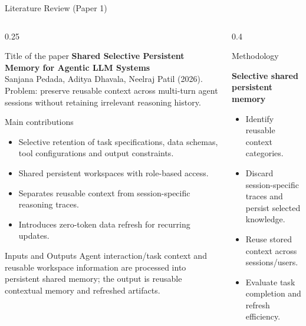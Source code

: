 \begin{frame}{Literature Review (Paper 1)}
\begin{columns}[T]
  \begin{column}{0.25\textwidth}
    \begin{block}{Title of the paper \cite{pedada26}}
      \tiny \textbf{Shared Selective Persistent Memory for Agentic LLM Systems}\\[2pt] Sanjana Pedada, Aditya Dhavala, Neelraj Patil (2026).\\[2pt] Problem: preserve reusable context across multi-turn agent sessions without retaining irrelevant reasoning history.
    \end{block}
    \vspace{0.12cm}
    \begin{block}{Main contributions}
      \tiny
      \begin{itemize}\setlength\itemsep{1pt}
      \item Selective retention of task specifications, data schemas, tool configurations and output constraints.
\item Shared persistent workspaces with role-based access.
\item Separates reusable context from session-specific reasoning traces.
\item Introduces zero-token data refresh for recurring updates.
      \end{itemize}
    \end{block}
    \vspace{0.12cm}
    \begin{block}{Inputs and Outputs}
      \tiny Agent interaction/task context and reusable workspace information are processed into persistent shared memory; the output is reusable contextual memory and refreshed artifacts.
    \end{block}
  \end{column}

  \begin{column}{0.4\textwidth}
    \begin{block}{Methodology}
    \tiny
    \begin{center}
    \textbf{Selective shared persistent memory}
    \end{center}
    \begin{itemize}\setlength\itemsep{1pt}
    \item Identify reusable context categories.
\item Discard session-specific traces and persist selected knowledge.
\item Reuse stored context across sessions/users.
\item Evaluate task completion and refresh efficiency.
    \end{itemize}
    \end{block}


\end{column}
\end{columns}
\end{frame}
